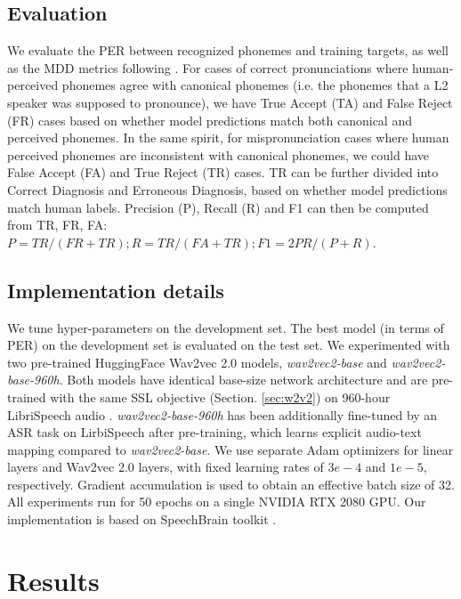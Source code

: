 \documentclass[a4paper]{article}
\newcommand{\Mu}[1]{\textcolor{blue}{Mu:#1}}
\begin{document}
\subsection{Evaluation}

We evaluate the PER between recognized phonemes and training targets, as well as the MDD metrics following \cite{peng21e_interspeech, li2016mispronunciation}. For cases of correct pronunciations where human-perceived phonemes agree with canonical phonemes (i.e. the phonemes that a L2 speaker was supposed to pronounce), we have True Accept (TA) and False Reject (FR) cases based on whether model predictions match both canonical and perceived phonemes. In the same spirit, for mispronunciation cases where human perceived phonemes are inconsistent with canonical phonemes, we could have False Accept (FA) and True Reject (TR) cases. TR can be further divided into Correct Diagnosis and Erroneous Diagnosis, based on whether model predictions match human labels. Precision (P), Recall (R) and F1 can then be computed from TR, FR, FA: $P = TR/(FR+TR); R = TR/(FA+TR); F1=2PR/(P+R)$.


\subsection{Implementation details}

We tune hyper-parameters on the development set. The best model (in terms of PER) on the development set is evaluated on the test set. We experimented with two pre-trained HuggingFace \cite{wolf2020transformers} Wav2vec 2.0 models, \textit{wav2vec2-base} and \textit{wav2vec2-base-960h}. Both models have identical base-size network architecture and are pre-trained with the same SSL objective (Section. \ref{sec:w2v2}) on 960-hour LibriSpeech audio \cite{panayotov2015librispeech}. \textit{wav2vec2-base-960h} has been additionally fine-tuned by an ASR task on LirbiSpeech after pre-training, which learns explicit audio-text mapping compared to \textit{wav2vec2-base}. We use separate Adam optimizers for linear layers and Wav2vec 2.0 layers, with fixed learning rates of $3e-4$ and $1e-5$, respectively. Gradient accumulation is used to obtain an effective batch size of 32. All experiments run for 50 epochs on a single NVIDIA RTX 2080 GPU. Our implementation is based on SpeechBrain toolkit \cite{speechbrain}. 

\section{Results}
\end{document}
